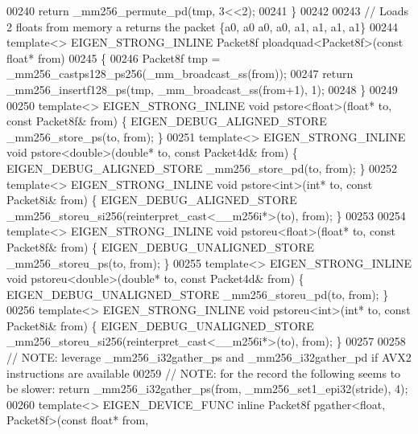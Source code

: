 \begin{DoxyCode}
{{00240   \textcolor{keywordflow}{return}  \_mm256\_permute\_pd(tmp, 3<<2);
00241 \}
00242 
00243 \textcolor{comment}{// Loads 2 floats from memory a returns the packet \{a0, a0  a0, a0, a1, a1, a1, a1\}}
00244 \textcolor{keyword}{template}<> EIGEN\_STRONG\_INLINE Packet8f ploadquad<Packet8f>(\textcolor{keyword}{const} \textcolor{keywordtype}{float}* from)
00245 \{
00246   Packet8f tmp = \_mm256\_castps128\_ps256(\_mm\_broadcast\_ss(from));
00247   \textcolor{keywordflow}{return} \_mm256\_insertf128\_ps(tmp, \_mm\_broadcast\_ss(from+1), 1);
00248 \}
00249 
00250 \textcolor{keyword}{template}<> EIGEN\_STRONG\_INLINE \textcolor{keywordtype}{void} pstore<float>(\textcolor{keywordtype}{float}*   to, \textcolor{keyword}{const} Packet8f& from) \{ 
      EIGEN\_DEBUG\_ALIGNED\_STORE \_mm256\_store\_ps(to, from); \}
00251 \textcolor{keyword}{template}<> EIGEN\_STRONG\_INLINE \textcolor{keywordtype}{void} pstore<double>(\textcolor{keywordtype}{double}* to, \textcolor{keyword}{const} Packet4d& from) \{ 
      EIGEN\_DEBUG\_ALIGNED\_STORE \_mm256\_store\_pd(to, from); \}
00252 \textcolor{keyword}{template}<> EIGEN\_STRONG\_INLINE \textcolor{keywordtype}{void} pstore<int>(\textcolor{keywordtype}{int}*       to, \textcolor{keyword}{const} Packet8i& from) \{ 
      EIGEN\_DEBUG\_ALIGNED\_STORE \_mm256\_storeu\_si256(reinterpret\_cast<\_\_m256i*>(to), from); \}
00253 
00254 \textcolor{keyword}{template}<> EIGEN\_STRONG\_INLINE \textcolor{keywordtype}{void} pstoreu<float>(\textcolor{keywordtype}{float}*   to, \textcolor{keyword}{const} Packet8f& from) \{ 
      EIGEN\_DEBUG\_UNALIGNED\_STORE \_mm256\_storeu\_ps(to, from); \}
00255 \textcolor{keyword}{template}<> EIGEN\_STRONG\_INLINE \textcolor{keywordtype}{void} pstoreu<double>(\textcolor{keywordtype}{double}* to, \textcolor{keyword}{const} Packet4d& from) \{ 
      EIGEN\_DEBUG\_UNALIGNED\_STORE \_mm256\_storeu\_pd(to, from); \}
00256 \textcolor{keyword}{template}<> EIGEN\_STRONG\_INLINE \textcolor{keywordtype}{void} pstoreu<int>(\textcolor{keywordtype}{int}*       to, \textcolor{keyword}{const} Packet8i& from) \{ 
      EIGEN\_DEBUG\_UNALIGNED\_STORE \_mm256\_storeu\_si256(reinterpret\_cast<\_\_m256i*>(to), from); \}
00257 
00258 \textcolor{comment}{// NOTE: leverage \_mm256\_i32gather\_ps and \_mm256\_i32gather\_pd if AVX2 instructions are available}
00259 \textcolor{comment}{// NOTE: for the record the following seems to be slower: return \_mm256\_i32gather\_ps(from,
       \_mm256\_set1\_epi32(stride), 4);}
00260 \textcolor{keyword}{template}<> EIGEN\_DEVICE\_FUNC \textcolor{keyword}{inline} Packet8f pgather<float, Packet8f>(\textcolor{keyword}{const} \textcolor{keywordtype}{float}* from, 
}}
\end{DoxyCode}
